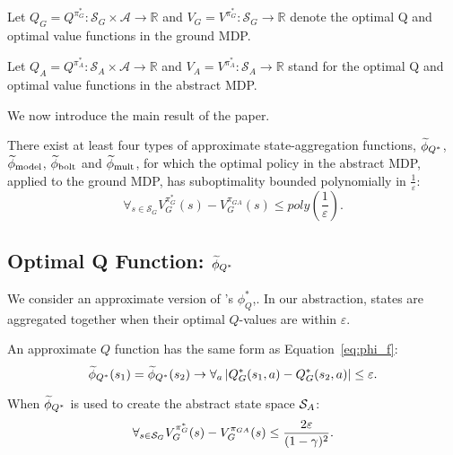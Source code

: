 Let $Q_G = Q^{\pi_G^*} : \mathcal{S}_G \times \mathcal{A} \rightarrow \mathbb{R} $ and $V_G = V^{\pi_G^*}: \mathcal{S}_G \rightarrow \mathbb{R} $ denote the optimal Q and optimal value functions in the ground \ac{MDP}.
\edefn

Let $Q_A  = Q^{\pi_A^*}: \mathcal{S}_A \times \mathcal{A} \rightarrow \mathbb{R}$ and $V_A  = V^{\pi_A^*}: \mathcal{S}_A \rightarrow \mathbb{R}$  stand for the optimal Q and optimal value functions in the abstract \ac{MDP}.
\edefn

We now introduce the main result of the paper.

\begin{thm}
There exist at least four types of approximate state-aggregation functions, $\epQ$, $\widetilde \phi_{\text{model}}$, $\widetilde \phi_{\text{bolt}}$ and $\widetilde \phi_{\text{mult}}$, for which the optimal policy in the abstract \ac{MDP}, applied to the ground \ac{MDP}, has suboptimality bounded polynomially in $\frac{1}{\varepsilon}$:
\begin{equation}
\forall_{s \in \mathcal{S}_G} V_G^{\pi_G^*}(s) - V_G^{\pi_{GA}}(s) \leq poly \left (\frac{1}{\varepsilon} \right).
\end{equation}
\end{thm}

\subsection{Optimal Q Function: $\widetilde \phi_{Q^*}$}
\label{sec:Q*}

We consider an approximate version of \citet{li2006towards}'s $\phi_Q^*$,. In our abstraction, states are aggregated together when their optimal $Q$-values are within $\varepsilon$.

\bdefn{$\epQ$}
An approximate $Q$ function has the same form as Equation~\ref{eq:phi_f}:
\begin{equation}
\widetilde \phi_{Q^*}(s_1) = \widetilde \phi_{Q^*}(s_2) \rightarrow \forall_a \left|Q_G^*(s_1, a) - Q_G^*(s_2, a)\right| \leq \varepsilon.
\end{equation}
\edefn

\begin{lma}
\label{lma:Q*}
When $\widetilde \phi_{Q^*}$ is used to create the abstract state space $\mathcal{S}_A$:
\begin{equation}
\forall_{s \in \mathcal{S}_G} V_G^{\pi_G^*}(s) - V_G^{\pi_{GA}}(s) \leq \frac{2\varepsilon}{(1-\gamma)^2}.
\end{equation}
\end{lma}

